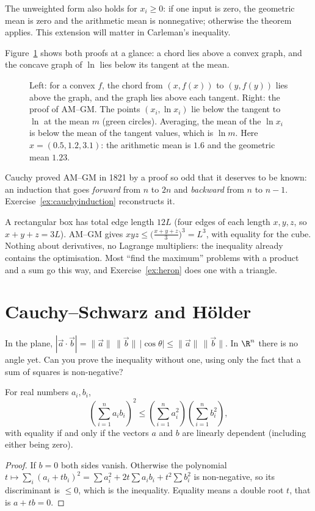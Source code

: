 The unweighted form also holds for $x_i\ge0$: if one input is zero, the
geometric mean is zero and the arithmetic mean is nonnegative; otherwise the
theorem applies. This extension will matter in Carleman's inequality.

Figure~\ref{fig:convex} shows both proofs at a glance: a chord lies above a convex graph, and the concave graph of $\ln$ lies below its tangent at the mean.

\begin{figure}[ht]
\centering
{}
\caption{Left: for a convex $f$, the chord from $(x,f(x))$ to $(y,f(y))$ lies above the graph, and the graph lies above each tangent. Right: the proof of AM--GM. The points $(x_i,\ln x_i)$ lie below the tangent to $\ln$ at the mean $m$ (green circles). Averaging, the mean of the $\ln x_i$ is below the mean of the tangent values, which is $\ln m$. Here $x=(0.5,1.2,3.1)$: the arithmetic mean is $1.6$ and the geometric mean $1.23$.}
\label{fig:convex}
\end{figure}

Cauchy proved AM--GM in 1821 by a proof so odd that it deserves to be known: an induction that goes \emph{forward} from $n$ to $2n$ and
\emph{backward} from $n$ to $n-1$. Exercise~\ref{ex:cauchyinduction} reconstructs it.

\begin{examplex}
A rectangular box has total edge length $12L$ (four edges of each length $x,y,z$, so $x+y+z=3L$). AM--GM gives $xyz\le\bigl(\frac{x+y+z}3\bigr)^3=L^3$,
with equality for the cube. Nothing about derivatives, no Lagrange multipliers: the inequality already contains the optimisation. Most ``find the
maximum'' problems with a product and a sum go this way, and Exercise~\ref{ex:heron} does one with a triangle.
\end{examplex}

\section{Cauchy--Schwarz and H\"older}

\begin{think}
In the plane, $|\vec a\cdot\vec b|=\|\vec a\|\,\|\vec b\|\,|\cos\theta|\le\|\vec a\|\,\|\vec b\|$. In $\R^n$ there is no angle yet. Can you prove the inequality without one, using only the fact that a sum of squares is non-negative?
\end{think}

\begin{theorem}\label{thm:cs}
For real numbers $a_i,b_i$,
\[
\left(\sum_{i=1}^na_ib_i\right)^2\le\left(\sum_{i=1}^na_i^2\right)\left(\sum_{i=1}^nb_i^2\right),
\]
with equality if and only if the vectors $a$ and $b$ are linearly dependent (including either being zero).
\end{theorem}
\begin{proof}
If $b=0$ both sides vanish. Otherwise the polynomial $t\mapsto\sum_i(a_i+tb_i)^2=\sum a_i^2+2t\sum a_ib_i+t^2\sum b_i^2$ is non-negative, so its discriminant is $\le0$, which is the inequality.
Equality means a double root $t$, that is $a+tb=0$.
\end{proof}

